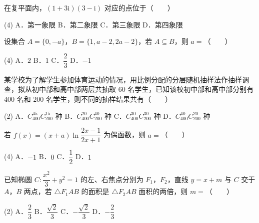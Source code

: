 \begin{question}
在复平面内，$(1+3\mathrm i)(3-\mathrm i)$ 对应的点位于\mbox{（　　）}

\begin{gkopts}(4)
\task A．第一象限
\task B．第二象限
\task C．第三象限
\task D．第四象限
\end{gkopts}

\end{question}
\begin{question}
设集合 $A=\{0,-a\}$，$B=\{1,a-2,2a-2\}$，若 $A\subseteq B$，则 $a=$\mbox{（　　）}

\begin{gkopts}(4)
\task A．$2$
\task B．$1$
\task C．$\dfrac23$
\task D．$-1$
\end{gkopts}

\end{question}
\begin{question}
某学校为了解学生参加体育运动的情况，用比例分配的分层随机抽样法作抽样调查，拟从初中部和高中部两层共抽取 $60$ 名学生，已知该校初中部和高中部分别有 $400$ 名和 $200$ 名学生，则不同的抽样结果共有\mbox{（　　）}

\begin{gkopts}(2)
\task A．$C_{400}^{45}C_{200}^{15}$ 种
\task B．$C_{400}^{20}C_{200}^{40}$ 种
\task C．$C_{400}^{30}C_{200}^{30}$ 种
\task D．$C_{400}^{40}C_{200}^{20}$ 种
\end{gkopts}

\end{question}
\begin{question}
若 $f(x)=(x+a)\ln\dfrac{2x-1}{2x+1}$ 为偶函数，则 $a=$\mbox{（　　）}

\begin{gkopts}(4)
\task A．$-1$
\task B．$0$
\task C．$\dfrac12$
\task D．$1$
\end{gkopts}

\end{question}
\begin{question}
已知椭圆 $C:\dfrac{x^{2}}3+y^{2}=1$ 的左、右焦点分别为 $F_1$，$F_2$，直线 $y=x+m$ 与 $C$ 交于 $A$，$B$ 两点，若 $\triangle F_1AB$ 的面积是 $\triangle F_2AB$ 面积的两倍，则 $m=$\mbox{（　　）}

\begin{gkopts}(2)
\task A．$\dfrac23$
\task B．$\dfrac{\sqrt2}3$
\task C．$-\dfrac{\sqrt2}3$
\task D．$-\dfrac23$
\end{gkopts}

\end{question}
